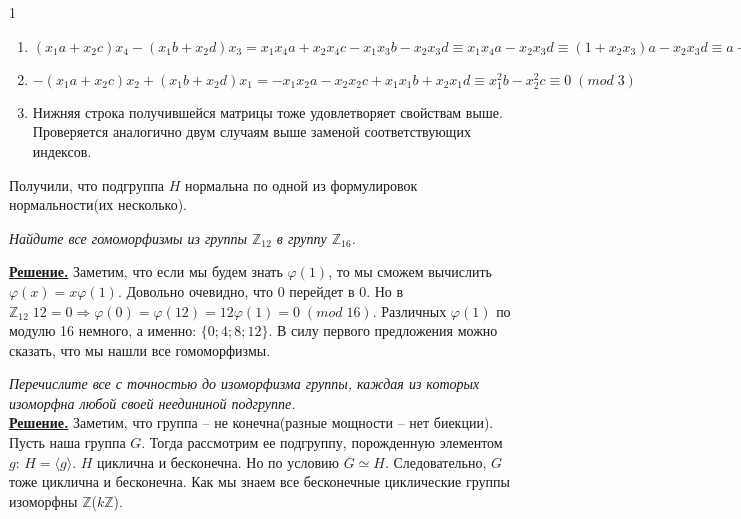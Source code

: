 \documentclass[14pt,a4paper]{scrartcl}
\begin{document}
\begin{spacing}{1}
\begin{enumerate}
		\item $(x_1a+x_2c)x_4 - (x_1b+x_2d)x_3 = x_1x_4a + x_2x_4c - x_1x_3b-x_2x_3d \equiv x_1x_4a-x_2x_3d \equiv (1 + x_2x_3)a - x_2x_3d \equiv a + x_2x_3(a - d) \equiv a \equiv 1\;(mod\;3)$
		\item $-(x_1a+x_2c)x_2 + (x_1b+x_2d)x_1 = -x_1x_2a - x_2x_2c + x_1x_1b+x_2x_1d \equiv x_1^2b - x_2^2c \equiv 0\;(mod\;3)$
		\item Нижняя строка получившейся матрицы тоже удовлетворяет свойствам выше. Проверяется аналогично двум случаям выше заменой соответствующих индексов.
	\end{enumerate}
	Получили, что подгруппа $H$ нормальна по одной из формулировок нормальности(их несколько).
	
	
	\begin{center}
	\end{center}
	\textit{Найдите все гомоморфизмы из группы $\mathbb{Z}_{12}$ в группу $\mathbb{Z}_{16}$.}
	
	\noindent \textbf{\underline{Решение.}} Заметим, что если мы будем знать $\varphi(1)$, то мы сможем вычислить $\varphi(x) = x\varphi(1)$. Довольно очевидно, что 0 перейдет в 0. Но в $\mathbb{Z}_{12}\;12 = 0 \Rightarrow \varphi(0) = \varphi(12) = 12\varphi(1) = 0\;(mod\;16)$. Различных $\varphi(1)$ по модулю 16 немного, а именно: $\{0; 4; 8; 12\}$. В силу первого предложения можно сказать, что мы нашли все гомоморфизмы.
	
	\begin{center}
	\end{center}
	\textit{Перечислите все с точностью до изоморфизма группы, каждая из которых изоморфна любой своей неедининой подгруппе.}\\
	\noindent \textbf{\underline{Решение.}} Заметим, что группа -- не конечна(разные мощности -- нет биекции). Пусть наша группа $G$. Тогда рассмотрим ее подгруппу, порожденную элементом $g$: $H = \langle g \rangle$. $H$ циклична и бесконечна. Но по условию $G \simeq H$. Следовательно, $G$ тоже циклична и бесконечна. Как мы знаем все бесконечные циклические группы изоморфны $\mathbb{Z}$($k\mathbb{Z}$).
\end{spacing}
\end{document}
